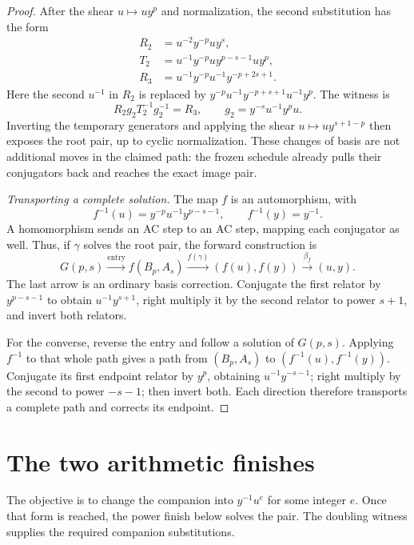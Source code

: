\documentclass[11pt]{article}
\theoremstyle{definition}\newtheorem{definition}[theorem]{Definition}
\theoremstyle{remark}\newtheorem{remark}[theorem]{Remark}
\begin{document}
\begin{proof}
After the shear $u\mapsto uy^p$ and normalization, the second substitution has the form
\[
\begin{aligned}
R_2&=u^{-2}y^{-p}uy^s,\\
T_2&=u^{-1}y^{-p}uy^{p-s-1}uy^p,\\
R_3&=u^{-1}y^{-p}u^{-1}y^{-p+2s+1}.
\end{aligned}
\]
Here the second $u^{-1}$ in $R_2$ is replaced by $y^{-p}u^{-1}y^{-p+s+1}u^{-1}y^p$. The witness is
\[
R_2g_2T_2^{-1}g_2^{-1}=R_3,\qquad g_2=y^{-s}u^{-1}y^pu.
\]
Inverting the temporary generators and applying the shear $u\mapsto uy^{s+1-p}$ then exposes the root pair, up to cyclic normalization. These changes of basis are not additional moves in the claimed path: the frozen schedule already pulls their conjugators back and reaches the exact image pair.

\emph{Transporting a complete solution.} The map $f$ is an automorphism, with
\[
f^{-1}(u)=y^{-p}u^{-1}y^{p-s-1},\qquad f^{-1}(y)=y^{-1}.
\]
A homomorphism sends an AC step to an AC step, mapping each conjugator as well. Thus, if $\gamma$ solves the root pair, the forward construction is
\[
G(p,s)\xrightarrow{\text{entry}}f(B_p,A_s)
\xrightarrow{f(\gamma)}(f(u),f(y))
\xrightarrow{\beta_f}(u,y).
\]
The last arrow is an ordinary basis correction. Conjugate the first relator by $y^{p-s-1}$ to obtain $u^{-1}y^{s+1}$, right multiply it by the second relator to power $s+1$, and invert both relators.

For the converse, reverse the entry and follow a solution of $G(p,s)$. Applying $f^{-1}$ to that whole path gives a path from $(B_p,A_s)$ to $(f^{-1}(u),f^{-1}(y))$. Conjugate its first endpoint relator by $y^p$, obtaining $u^{-1}y^{-s-1}$; right multiply by the second to power $-s-1$; then invert both. Each direction therefore transports a complete path and corrects its endpoint.
\end{proof}

\pagebreak[2]
\section{The two arithmetic finishes}
The objective is to change the companion into $y^{-1}u^e$ for some integer $e$. Once that form is reached, the power finish below solves the pair. The doubling witness supplies the required companion substitutions.
\end{document}
